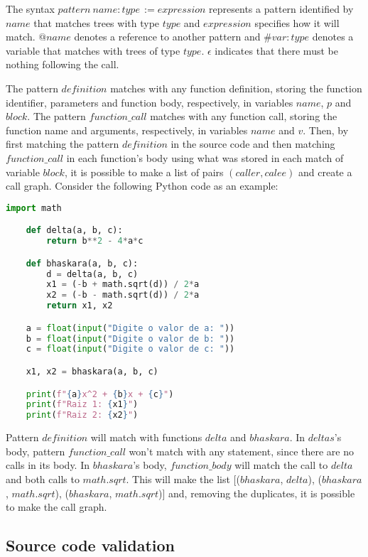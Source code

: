 The syntax \(pattern \: name : type \, := expression\) represents a pattern 
identified by \(name\) that matches trees with type \(type\) and \(expression\)
specifies how it will match. \(@name\) denotes a reference to another pattern
and \(\#var:type\) denotes a variable that matches with trees of type \(type\).
\textit{\(\epsilon\)} indicates that there must be nothing following the call.

The pattern \(definition\) matches with any function definition, storing the
function identifier, parameters and function body, respectively, in variables \(name\),
\(p\) and \(block\). The pattern \(function\_call\) matches with any function 
call, storing the function name and arguments, respectively, in variables \(name\)
and \(v\). Then, by first matching the pattern \(definition\) in the source code
and then matching \(function\_call\) in each function's body using what was stored in
each match of variable \(block\), it is possible to make a list of pairs \((caller, calee)\)
and create a call graph. Consider the following Python code as an example:


\begin{lstlisting}[language=Python]
    import math

    def delta(a, b, c):
        return b**2 - 4*a*c

    def bhaskara(a, b, c):
        d = delta(a, b, c)
        x1 = (-b + math.sqrt(d)) / 2*a
        x2 = (-b - math.sqrt(d)) / 2*a
        return x1, x2

    a = float(input("Digite o valor de a: "))
    b = float(input("Digite o valor de b: "))
    c = float(input("Digite o valor de c: "))

    x1, x2 = bhaskara(a, b, c)

    print(f"{a}x^2 + {b}x + {c}")
    print(f"Raiz 1: {x1}")
    print(f"Raiz 2: {x2}")
\end{lstlisting}

Pattern \(definition\) will match with functions \(delta\) and \(bhaskara\). In 
\(deltas\)'s body, pattern \(function\_call\) won't match with any statement, 
since there are no calls in its body. In \(bhaskara\)'s body, \(function\_body\)
will match the call to \(delta\) and both calls to \(math.sqrt\). This will make
the list [(\(bhaskara\), \(delta\)), (\(bhaskara\), \(math.sqrt\)), 
(\(bhaskara\), \(math.sqrt\))]
and, removing the duplicates, it is possible to make the call graph.

\subsection{Source code validation}

